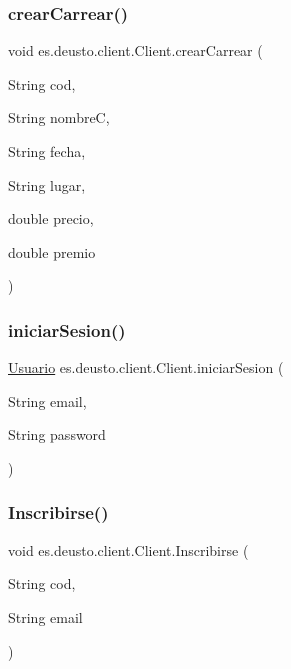\mbox{\label{classes_1_1deusto_1_1client_1_1_client_a0efc9ad350a61ae5277827eb1964b890}} 
\subsubsection{\texorpdfstring{crearCarrear()}{crearCarrear()}}
{\footnotesize\ttfamily void es.\+deusto.\+client.\+Client.\+crear\+Carrear (\begin{DoxyParamCaption}\item[{String}]{cod,  }\item[{String}]{nombreC,  }\item[{String}]{fecha,  }\item[{String}]{lugar,  }\item[{double}]{precio,  }\item[{double}]{premio }\end{DoxyParamCaption})}

\mbox{\label{classes_1_1deusto_1_1client_1_1_client_a4cc1480125fa35b37c37e8e1e79d91f6}} 
\subsubsection{\texorpdfstring{iniciarSesion()}{iniciarSesion()}}
{\footnotesize\ttfamily \mbox{\hyperlink{classes_1_1deusto_1_1server_1_1jdo_1_1_usuario}{Usuario}} es.\+deusto.\+client.\+Client.\+iniciar\+Sesion (\begin{DoxyParamCaption}\item[{String}]{email,  }\item[{String}]{password }\end{DoxyParamCaption})}

\mbox{\label{classes_1_1deusto_1_1client_1_1_client_adbe22bb52fdcd07747e848fb6f73d73d}} 
\subsubsection{\texorpdfstring{Inscribirse()}{Inscribirse()}}
{\footnotesize\ttfamily void es.\+deusto.\+client.\+Client.\+Inscribirse (\begin{DoxyParamCaption}\item[{String}]{cod,  }\item[{String}]{email }\end{DoxyParamCaption})}

